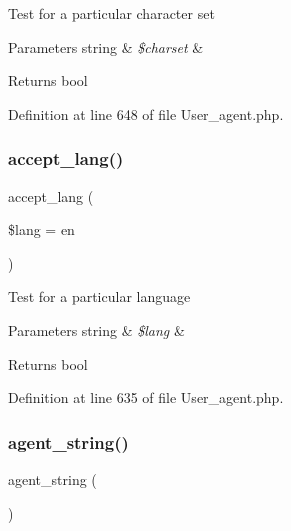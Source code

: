 Test for a particular character set


\begin{DoxyParams}[1]{Parameters}
string & {\em \$charset} & \\
\hline
\end{DoxyParams}
\begin{DoxyReturn}{Returns}
bool 
\end{DoxyReturn}


Definition at line 648 of file User\+\_\+agent.\+php.

\mbox{\label{class_c_i___user__agent_a89add2e480d14b5f755993f4f5e0bd72}} 
\subsubsection{\texorpdfstring{accept\_lang()}{accept\_lang()}}
{\footnotesize\ttfamily accept\+\_\+lang (\begin{DoxyParamCaption}\item[{}]{\$lang = {\ttfamily \textquotesingle{}en\textquotesingle{}} }\end{DoxyParamCaption})}

Test for a particular language


\begin{DoxyParams}[1]{Parameters}
string & {\em \$lang} & \\
\hline
\end{DoxyParams}
\begin{DoxyReturn}{Returns}
bool 
\end{DoxyReturn}


Definition at line 635 of file User\+\_\+agent.\+php.

\mbox{\label{class_c_i___user__agent_a2a75d1ec3cf3f59cdcae64f6afbc8a1b}} 
\subsubsection{\texorpdfstring{agent\_string()}{agent\_string()}}
{\footnotesize\ttfamily agent\+\_\+string (\begin{DoxyParamCaption}{ }\end{DoxyParamCaption})}

